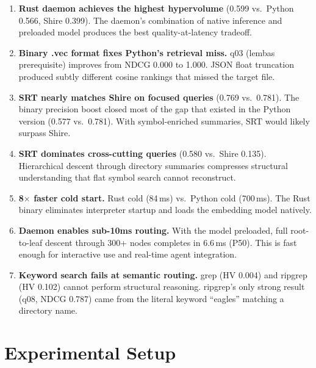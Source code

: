 \documentclass[11pt,a4paper]{article}
\begin{document}
\begin{enumerate}[nosep]
    \item \textbf{Rust daemon achieves the highest hypervolume} (0.599 vs.\ Python 0.566, Shire 0.399). The daemon's combination of native inference and preloaded model produces the best quality-at-latency tradeoff.

    \item \textbf{Binary .vec format fixes Python's retrieval miss.} q03 (lembas prerequisite) improves from NDCG 0.000 to 1.000. JSON float truncation produced subtly different cosine rankings that missed the target file.

    \item \textbf{SRT nearly matches Shire on focused queries} (0.769 vs.\ 0.781). The binary precision boost closed most of the gap that existed in the Python version (0.577 vs.\ 0.781). With symbol-enriched summaries, SRT would likely surpass Shire.

    \item \textbf{SRT dominates cross-cutting queries} (0.580 vs.\ Shire 0.135). Hierarchical descent through directory summaries compresses structural understanding that flat symbol search cannot reconstruct.

    \item \textbf{8$\times$ faster cold start.} Rust cold (84\,ms) vs.\ Python cold (700\,ms). The Rust binary eliminates interpreter startup and loads the embedding model natively.

    \item \textbf{Daemon enables sub-10ms routing.} With the model preloaded, full root-to-leaf descent through 300+ nodes completes in 6.6\,ms (P50). This is fast enough for interactive use and real-time agent integration.

    \item \textbf{Keyword search fails at semantic routing.} grep (HV 0.004) and ripgrep (HV 0.102) cannot perform structural reasoning. ripgrep's only strong result (q08, NDCG 0.787) came from the literal keyword ``eagles'' matching a directory name.
\end{enumerate}

\section{Experimental Setup}
\end{document}
